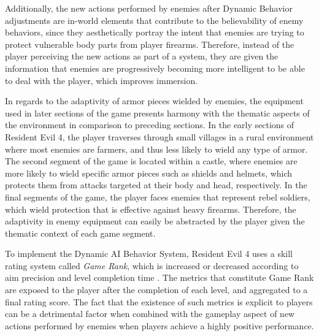 Additionally, the new actions performed by enemies after Dynamic Behavior adjustments are in-world elements that contribute to the believability of enemy behaviors, since they aesthetically portray the intent that enemies are trying to protect vulnerable body parts from player firearms. Therefore, instead of the player perceiving the new actions as part of a system, they are given the information that enemies are progressively becoming more intelligent to be able to deal with the player, which improves immersion.

In regards to the adaptivity of armor pieces wielded by enemies, the equipment used in later sections of the game presents harmony with the thematic aspects of the environment in comparison to preceding sections. In the early sections of Resident Evil 4, the player traverses through small villages in a rural environment where most enemies are farmers, and thus less likely to wield any type of armor. The second segment of the game is located within a castle, where enemies are more likely to wield specific armor pieces such as shields and helmets, which protects them from attacks targeted at their body and head, respectively. In the final segments of the game, the player faces enemies that represent rebel soldiers, which wield protection that is effective against heavy firearms. Therefore, the adaptivity in enemy equipment can easily be abstracted by the player given the thematic context of each game segment.


To implement the Dynamic AI Behavior System, Resident Evil 4 uses a skill rating system called \emph{Game Rank}, which is increased or decreased according to aim precision and level completion time \cite{RE4_JP_StrategyGuide}. The metrics that constitute Game Rank are exposed to the player after the completion of each level, and aggregated to a final rating score. The fact that the existence of such metrics is explicit to players can be a detrimental factor when combined with the gameplay aspect of new actions performed by enemies when players achieve a highly positive performance.

